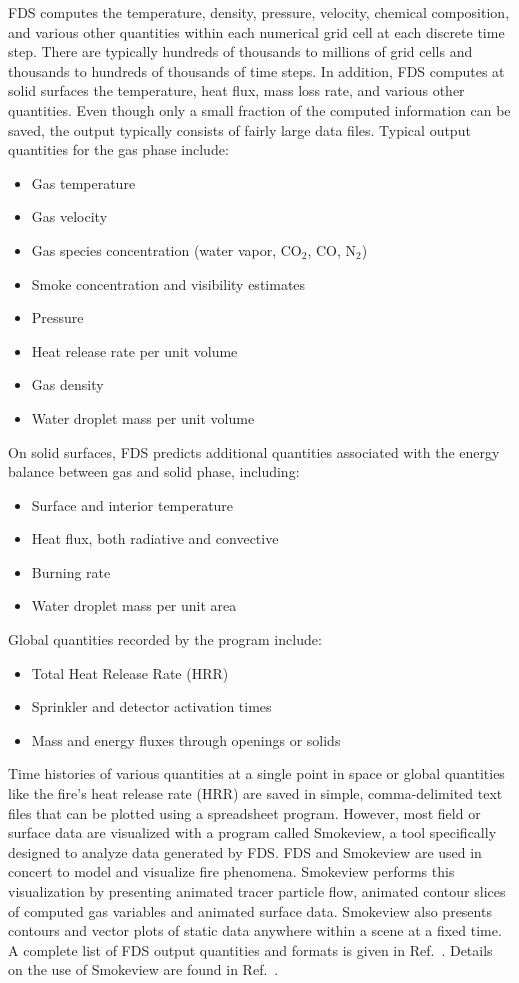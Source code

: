 \documentclass[11pt]{book}
\begin{document}
FDS computes the temperature, density, pressure, velocity, chemical composition, and various other quantities within each numerical grid cell at each discrete time step. There
are typically hundreds of thousands to millions of grid cells and thousands to hundreds of thousands of time steps. In addition, FDS computes at
solid surfaces the temperature, heat flux, mass loss rate, and various other quantities. Even though only a small fraction of the computed information can be saved, the output typically
consists of fairly large data files. Typical output quantities for the gas phase include:
\begin{itemize}
\setlength{\itemsep}{0.0in}
\item Gas temperature
\item Gas velocity
\item Gas species concentration (water vapor, CO$_2$, CO, N$_2$)
\item Smoke concentration and visibility estimates
\item Pressure
\item Heat release rate per unit volume
\item Gas density
\item Water droplet mass per unit volume
\end{itemize}
On solid surfaces, FDS predicts additional quantities associated with the energy balance between gas and solid phase, including:
\begin{itemize}
\setlength{\itemsep}{0.0in}
\item Surface and interior temperature
\item Heat flux, both radiative and convective
\item Burning rate
\item Water droplet mass per unit area
\end{itemize}
Global quantities recorded by the program include:
\begin{itemize}
\setlength{\itemsep}{0.0in}
\item Total Heat Release Rate (HRR)
\item Sprinkler and detector activation times
\item Mass and energy fluxes through openings or solids
\end{itemize}
Time histories of various quantities at a single point in space or global quantities like the fire's heat release rate (HRR) are saved in simple, comma-delimited text files that can be plotted using a spreadsheet program. However, most field or surface data are visualized with a program called Smokeview, a tool specifically designed to analyze data generated by FDS. FDS and Smokeview are used in concert to model and visualize fire phenomena. Smokeview performs this visualization by presenting animated tracer particle flow, animated contour slices of computed gas variables and animated surface data. Smokeview also presents contours and vector plots of static data anywhere within a scene at a fixed time. A complete list of FDS output quantities and formats is given in Ref.~\cite{FDS_Users_Guide}. Details on the use of Smokeview are found in Ref.~\cite{Smokeview_Users_Guide}.
\end{document}
